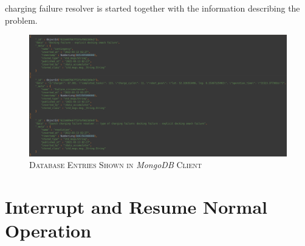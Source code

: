 \documentclass[english, master, utf8]{base/thesis_KBS}
\begin{document}
charging failure resolver is started together with the information describing the problem.
\begin{figure}[H]
    \centering
    \includegraphics[width=\textwidth]{pics/database_entries.png}
    \caption{\textsc{Database Entries Shown in} \textit{MongoDB} \textsc{Client}}
    \label{fig:database_entries}
\end{figure}

\section{Interrupt and Resume Normal Operation}
\label{sec:plan_interruption_section}
\end{document}
